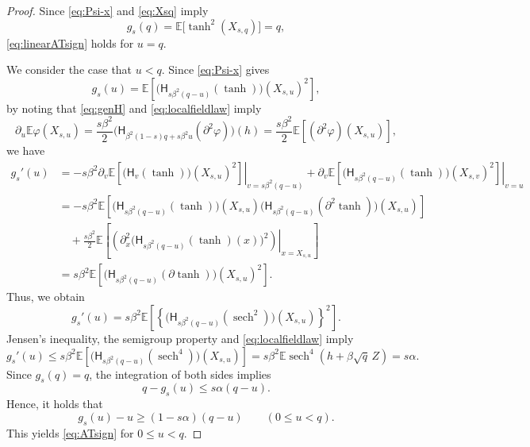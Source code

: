 \documentclass[11pt]{article}
\numberwithin{equation}{section}
\newcommand{\E}{\mathbb{E}}
\newcommand{\1}{\mathbf 1}
\newcommand{\sech}{\operatorname{sech}}
\begin{document}
\begin{proof}
Since \eqref{eq:Psi-x} and \eqref{eq:Xsq} imply
\[
g_s(q) = \E\bigl[ \tanh ^2 (X_{s,q}) \bigr] =q ,
\]
\eqref{eq:linearATsign} holds for $u=q$.

We consider the case that $u<q$. 
Since \eqref{eq:Psi-x} gives
\[
g_s(u) = \E\left[ \bigl(\mathsf H_{s\beta^2(q-u)} (\tanh )\bigr)(X_{s,u}) ^2 \right] ,
\]
by noting that \eqref{eq:genH} and \eqref{eq:localfieldlaw} imply
\[
\partial _u \E\varphi(X_{s,u}) = \frac{s\beta ^2}{2} \bigl(\mathsf H_{\beta^2(1-s)q+s\beta^2u} (\partial ^2 \varphi ) \bigr) (h) = \frac{s\beta ^2}{2} \E\left[ (\partial ^2 \varphi ) (X_{s,u}) \right] ,
\]
we have
\begin{align*}
g_s'(u) &= -s\beta^2 \left. \partial _v \E\left[ \bigl(\mathsf H_v (\tanh )\bigr)(X_{s,u}) ^2 \right] \right| _{v=s\beta^2(q-u)} + \left. \partial _v \E\left[ \bigl(\mathsf H_{s\beta^2(q-u)} (\tanh )\bigr)(X_{s,v}) ^2 \right] \right| _{v=u} \\
%
&= - s\beta^2 \E\left[ \bigl(\mathsf H_{s\beta^2(q-u)} (\tanh )\bigr)(X_{s,u}) \bigl(\mathsf H_{s\beta^2(q-u)} ( \partial ^2 \tanh )\bigr)(X_{s,u}) \right] \\
&\quad + \frac{s\beta ^2}{2} \E\left[ \left. \left( \partial _x ^2 \bigl(\mathsf H_{s\beta^2(q-u)} (\tanh ) (x)\bigr) ^2 \right) \right| _{x=X_{s,u}} \right] \\
%
&= s\beta ^2 \E\left[ \bigl(\mathsf H_{s\beta^2(q-u)} (\partial \tanh )\bigr) (X_{s,u}) ^2 \right] .
\end{align*}
Thus, we obtain
\[
 g_s'(u)
 =s\beta^2\E\left[
   \left\{
    \bigl(\mathsf H_{s\beta^2(q-u)}
      ( \sech^2 )\bigr)(X_{s,u})
   \right\}^2
 \right].
\]
Jensen's inequality, the semigroup property and \eqref{eq:localfieldlaw} imply
\[
 g_s'(u)
 \le s\beta^2\E\left[
   \bigl(\mathsf H_{s\beta^2(q-u)}
     ( \sech^4 )\bigr)(X_{s,u})
 \right]
 =s\beta^2\E\sech^4(h+\beta\sqrt q\,Z)
 =s\alpha.
\]
Since $g_s(q)=q$, the integration of both sides implies
\[
q - g_s(u) \leq s \alpha (q-u) .
\]
Hence, it holds that
\begin{equation}
 g_s(u)-u\ge(1-s\alpha)(q-u)
 \qquad(0\le u<q).
 \label{eq:leftstrict}
\end{equation}
This yields \eqref{eq:ATsign} for $0\le u<q$.


\end{proof}
\end{document}
